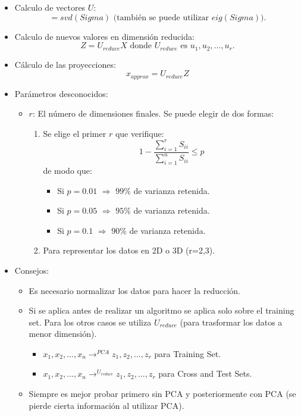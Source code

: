 \documentclass[12pt,a4paper]{article}
\begin{document}
\begin{itemize}
\item Calculo de vectores $U$:
\begin{equation*}
[U,S,V]=svd(Sigma) \mbox{ (también se puede utilizar $eig(Sigma)$)}.
\end{equation*}
\item Calculo de nuevos valores en dimensión reducida:
\begin{equation*}
Z=U_{reduce} X \mbox{ donde $U_{reduce}$ es $u_1, u_2, ..., u_r$}.
\end{equation*}
\item Cálculo de las proyecciones:
\begin{equation*}
x_{approx}=U_{reduce} Z
\end{equation*}
\item Parámetros desconocidos:
\begin{itemize}
\item $r$: El número de dimensiones finales. Se puede elegir de dos formas:
\begin{enumerate}
\item Se elige el primer $r$ que verifique:
\begin{equation*}
1-\dfrac{\sum_{i=1}^{r}S_{ii}}{\sum_{i=1}^{n}S_{ii}} \leq p
\end{equation*}
de modo que:
\begin{itemize}
\item Si $p=0.01$ $\Longrightarrow$ $99\%$ de varianza retenida.
\item Si $p=0.05$ $\Longrightarrow$ $95\%$ de varianza retenida.
\item Si $p=0.1$ $\Longrightarrow$ $90\%$ de varianza retenida.
\end{itemize}
\item Para representar los datos en 2D o 3D (r=2,3).
\end{enumerate}
\end{itemize}
\item Consejos:
\begin{itemize}
\item Es necesario normalizar los datos para hacer la reducción.
\item Si se aplica antes de realizar un algoritmo se aplica solo sobre el training set. Para los otros casos se utiliza $U_{reduce}$ (para trasformar los datos a menor dimensión).
\begin{itemize}
\item $x_1, x_2, ..., x_n \longrightarrow^{PCA} z_{1},z_2, ... ,z_{r}$ para Training Set.
\item $x_1, x_2, ..., x_n \longrightarrow^{U_{reduce}} z_{1},z_2, ... ,z_{r}$ para Cross and Test Sets.
\end{itemize}
\item Siempre es mejor probar primero sin PCA y posteriormente con PCA (se pierde cierta información al utilizar PCA).
\end{itemize}
\end{itemize}
\end{document}
